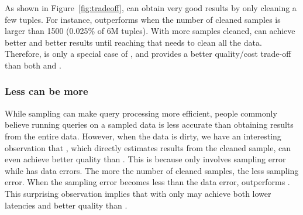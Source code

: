 

As shown in Figure~\ref{fig:tradeoff}, \saqpplus can obtain very good results by only cleaning a few tuples. For instance, \saqpplus outperforms \alldirty when the number of cleaned samples is larger than 1500 (0.025\% of 6M tuples). With more samples cleaned, \saqpplus can achieve better and better results until reaching \allclean that needs to clean all the data. Therefore, \allclean is only a special case of \saqpplus, and \saqpplus provides a better quality/cost trade-off than both \alldirty and \allclean. 





\subsubsection{Less can be more}\label{subsubsec:less-more} 
While sampling can make query processing more efficient, people commonly believe running queries on a sampled data is less accurate than obtaining results from the entire data. However, when the data is dirty, we have an interesting observation that \sampleclean, which directly estimates results from the cleaned sample, can even achieve better quality than \alldirty. This is because \sampleclean only involves sampling error while \alldirty has data errors. The more the number of cleaned samples, the less sampling error. When the sampling error becomes less than the data error, \sampleclean outperforms \alldirty. This surprising observation implies that \saqpplus with only \sampleclean may achieve both lower latencies and better quality than \alldirty. 



\fi
 
